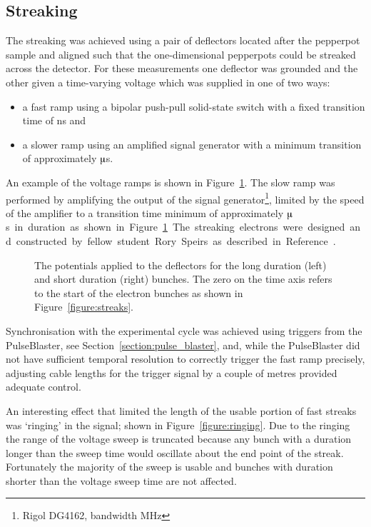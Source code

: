 \subsection{Streaking}
The streaking was achieved using a pair of deflectors located after the pepperpot sample and aligned such that the one-dimensional pepperpots could be streaked across the detector.
For these measurements one deflector was grounded and the other given a time-varying voltage which was supplied in one of two ways:
\begin{itemize}
\item a fast ramp using a bipolar push-pull solid-state switch with a fixed transition time of \unit[10]{ns} and
\item a slower ramp using an amplified signal generator with a minimum transition of approximately \unit[10]{$\muup$s}.
\end{itemize}
An example of the voltage ramps is shown in Figure~\ref{figure:deflector_voltages}.
The slow ramp was performed by amplifying the output of the signal generator\footnote{Rigol DG4162, bandwidth \unit[160]{MHz}}, limited by the speed of the amplifier to a transition time minimum of approximately \unit[10]{$\muup$s} in duration as shown in Figure~\ref{figure:deflector_voltages}.
The streaking electrons were designed and constructed by fellow student Rory Speirs as described in Reference~\cite{speirs_electron_2017}.

\begin{figure}
    \center
    
    \caption[Streak deflector potential.]{The potentials applied to the deflectors for the long duration (left) and short duration (right) bunches. The zero on the time axis refers to the start of the electron bunches as shown in Figure~\ref{figure:streaks}.}
    \label{figure:deflector_voltages}
\end{figure}

Synchronisation with the experimental cycle was achieved using triggers from the PulseBlaster, see Section~\ref{section:pulse_blaster}, and, while the PulseBlaster did not have sufficient temporal resolution to correctly trigger the fast ramp precisely, adjusting cable lengths for the trigger signal by a couple of metres provided adequate control.

An interesting effect that limited the length of the usable portion of fast streaks was `ringing' in the signal; shown in Figure~\ref{figure:ringing}.
Due to the ringing the range of the voltage sweep is truncated because any bunch with a duration longer than the sweep time would oscillate about the end point of the streak.
Fortunately the majority of the sweep is usable and bunches with duration shorter than the voltage sweep time are not affected.

